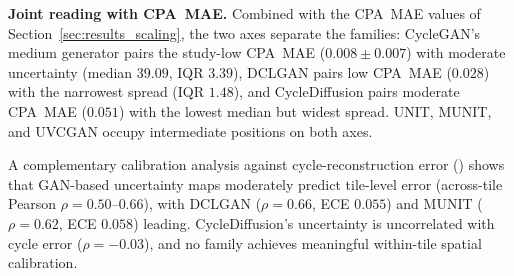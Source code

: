 \noindent\textbf{Joint reading with CPA~MAE.}
Combined with the CPA~MAE values of Section~\ref{sec:results_scaling}, the two axes
separate the families: CycleGAN's medium generator pairs the study-low CPA~MAE
($0.008 \pm 0.007$) with moderate uncertainty (median $39.09$, IQR $3.39$), DCLGAN pairs
low CPA~MAE ($0.028$) with the narrowest spread (IQR $1.48$), and CycleDiffusion pairs
moderate CPA~MAE ($0.051$) with the lowest median but widest spread.
UNIT, MUNIT, and UVCGAN occupy intermediate positions on both axes.

A complementary calibration analysis against cycle-reconstruction error
() shows that GAN-based uncertainty maps moderately predict
tile-level error (across-tile Pearson $\rho = 0.50$--$0.66$), with DCLGAN
($\rho = 0.66$, ECE $0.055$) and MUNIT ($\rho = 0.62$, ECE $0.058$) leading.
CycleDiffusion's uncertainty is uncorrelated with cycle error ($\rho = {-}0.03$),
and no family achieves meaningful within-tile spatial calibration.

%
%
